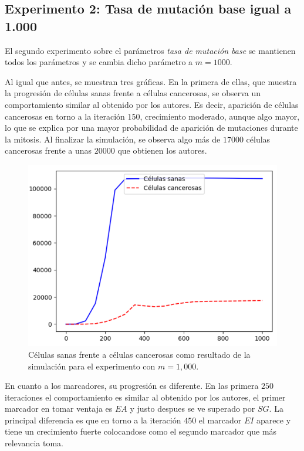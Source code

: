 \subsection{Experimento 2: Tasa de mutación base igual a 1.000}

El segundo experimento sobre el parámetros \textit{tasa de mutación base} se
mantienen todos los parámetros y se cambia dicho parámetro a $m=1000$.

Al igual que antes, se muestran tres gráficas. En la primera de ellas, que muestra la progresión de
células sanas frente a células cancerosas, se observa un comportamiento similar al obtenido
por los autores. Es decir, aparición de células cancerosas en torno a la iteración $150$,
crecimiento moderado, aunque algo mayor, lo que se explica por una mayor
probabilidad de aparición de mutaciones durante la mitosis. Al finalizar la simulación, se
observa algo más de $17000$ células cancerosas frente a unas $20000$ que obtienen los autores.

\begin{figure}[h]
\centering
\includegraphics[scale=0.8]{figures/experiments/exp2/healthvscarcino}
\caption{Células sanas frente a células cancerosas como resultado de la simulación para el experimento con $m = 1,000$.}
\end{figure}

En cuanto a los marcadores, su progresión es diferente. En las primera $250$ iteraciones
el comportamiento es similar al obtenido por los autores, el primer marcador en tomar ventaja es
$EA$ y justo despues se ve superado por $SG$. La principal diferencia es que en torno a la iteración $450$
el marcador $EI$ aparece y tiene un crecimiento fuerte colocandose como el segundo marcador que más relevancia
toma.

